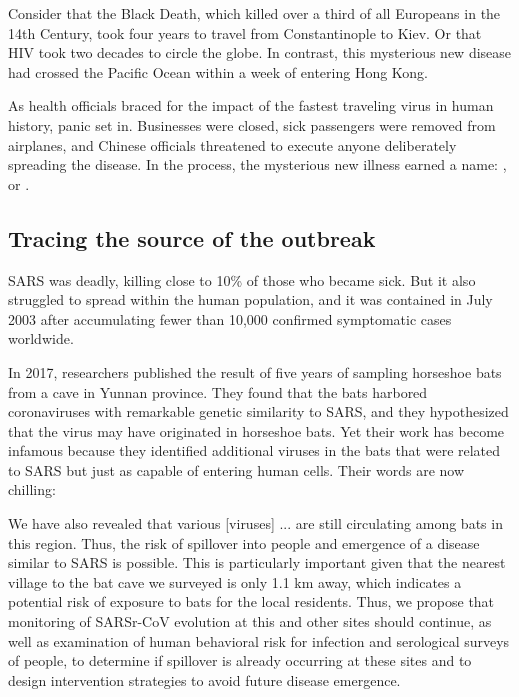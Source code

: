 Consider that the Black Death, which killed over a third of all Europeans in the 14th Century, took four years to travel from Constantinople to Kiev. Or that HIV took two decades to circle the globe. In contrast, this mysterious new disease had crossed the Pacific Ocean within a week of entering Hong Kong.

As health officials braced for the impact of the fastest traveling virus in human history, panic set in. Businesses were closed, sick passengers were removed from airplanes, and Chinese officials threatened to execute anyone deliberately spreading the disease. In the process, the mysterious new illness earned a name: , or .

\FloatBarrier
{}
\subsection{Tracing the source of the outbreak}

SARS was deadly, killing close to 10\% of those who became sick. But it also struggled to spread within the human population, and it was contained in July 2003 after accumulating fewer than 10,000 confirmed symptomatic cases worldwide.

In 2017, researchers published the result of five years of sampling horseshoe bats from a cave in Yunnan province. They found that the bats harbored coronaviruses with remarkable genetic similarity to SARS, and they hypothesized that the virus may have originated in horseshoe bats. Yet their work has become infamous because they identified additional viruses in the bats that were related to SARS but just as capable of entering human cells. Their words are now chilling:

\begin{itquote}
We have also revealed that various [viruses] ... are still circulating among bats in this region. Thus, the risk of spillover into people and emergence of a disease similar to SARS is possible. This is particularly important given that the nearest village to the bat cave we surveyed is only 1.1 km away, which indicates a potential risk of exposure to bats for the local residents. Thus, we propose that monitoring of SARSr-CoV evolution at this and other sites should continue, as well as examination of human behavioral risk for infection and serological surveys of people, to determine if spillover is already occurring at these sites and to design intervention strategies to avoid future disease emergence.
\end{itquote}

